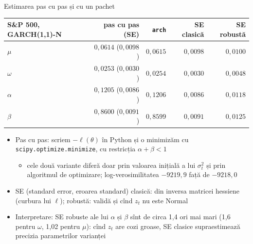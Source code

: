 \begin{frame}{Estimarea pas cu pas și cu un pachet}
\itemsize{\footnotesize}
\begin{center}
\footnotesize
\begin{tabular}{lrrrr}
\toprule
S\&P 500, GARCH(1,1)-N & pas cu pas (SE) & \texttt{arch} & SE clasică & SE robustă \\
\midrule
$\mu$ & $0{,}0614$ ($0{,}0098$) & $0{,}0615$ & $0{,}0098$ & $0{,}0100$ \\
$\omega$ & $0{,}0253$ ($0{,}0030$) & $0{,}0254$ & $0{,}0030$ & $0{,}0048$ \\
$\alpha$ & $0{,}1205$ ($0{,}0086$) & $0{,}1206$ & $0{,}0086$ & $0{,}0118$ \\
$\beta$ & $0{,}8600$ ($0{,}0091$) & $0{,}8599$ & $0{,}0091$ & $0{,}0125$ \\
\bottomrule
\end{tabular}
\end{center}
\begin{itemize}
    \item Pas cu pas: scriem $-\ell(\theta)$ în Python și o minimizăm cu \texttt{scipy.optimize.minimize}, cu restricția $\alpha + \beta < 1$
    \begin{itemize}
        \item cele două variante diferă doar prin valoarea inițială a lui $\sigma_t^2$ și prin algoritmul de optimizare; log-verosimilitatea $-9219{,}9$ față de $-9218{,}0$
    \end{itemize}
    \item SE (standard error, eroarea standard) clasică: din inversa matricei hessiene (curbura lui $\ell$); robustă: validă și cînd $z_t$ nu este Normal 
    \item Interpretare: SE robuste ale lui $\alpha$ și $\beta$ sînt de circa 1{,}4 ori mai mari (1{,}6 pentru $\omega$, 1{,}02 pentru $\mu$): cînd $z_t$ are cozi groase, SE clasice supraestimează precizia parametrilor varianței
\end{itemize}
\end{frame}

